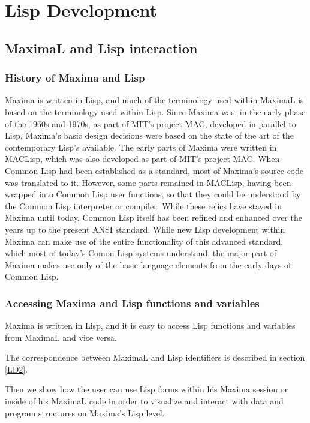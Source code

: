 \documentclass[../Maxima_Workbook.tex]{subfiles}
\begin{document}
	
\chapter{Lisp Development}

\section{MaximaL and Lisp interaction}

\subsection{History of Maxima and Lisp}

Maxima is written in Lisp, and much of the terminology used within MaximaL is based on the terminology used within Lisp. Since Maxima was, in the early phase of the 1960s and 1970s, as part of MIT's project MAC, developed in parallel to Lisp, Maxima's basic design decisions were based on the state of the art of the contemporary Lisp's available. The early parts of Maxima were written in MACLisp, which was also developed as part of MIT's project MAC. When Common Lisp had been established as a standard, most of Maxima's source code was translated to it. However, some parts remained in MACLisp, having been wrapped into Common Lisp user functions, so that they could be understood by the Common Lisp interpreter or compiler. While these relics have stayed in Maxima until today, Common Lisp itself has been refined and enhanced over the years up to the present ANSI standard. While new Lisp development within Maxima can make use of the entire functionality of this advanced standard, which most of today's Comon Lisp systems understand, the major part of Maxima makes use only of the basic language elements from the early days of Common Lisp.

\subsection{Accessing Maxima and Lisp functions and variables}

Maxima is written in Lisp, and it is easy to access Lisp functions and variables from MaximaL and vice versa. 

The correspondence between MaximaL and Lisp identifiers is described in section \ref{LD2}.

Then we show how the user can use Lisp forms within his Maxima session or inside of his MaximaL code in order to visualize and interact with data and program structures on Maxima's Lisp level.
\end{document}
